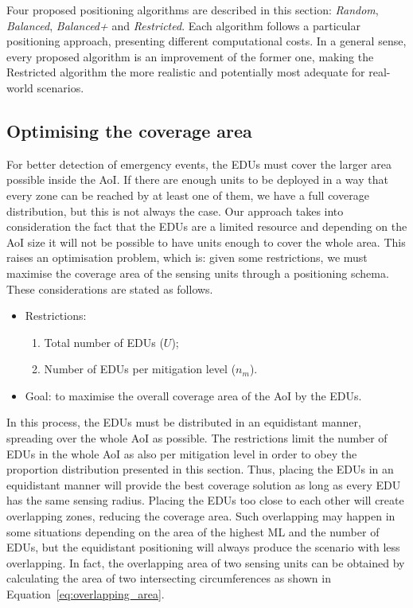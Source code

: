 \begin{refsection}
Four proposed positioning algorithms are described in this section: \emph{Random}, \emph{Balanced}, \emph{Balanced+} and \emph{Restricted}. Each algorithm follows a particular positioning approach, presenting different computational costs. In a general sense, every proposed algorithm is an improvement of the former one, making the Restricted algorithm the more realistic and potentially most adequate for real-world scenarios.

\subsection{Optimising the coverage area}

For better detection of emergency events, the EDUs must cover the larger area possible inside the AoI. If there are enough units to be deployed in a way that every zone can be reached by at least one of them, we have a full coverage distribution, but this is not always the case. Our approach takes into consideration the fact that the EDUs are a limited resource and depending on the AoI size it will not be possible to have units enough to cover the whole area. This raises an optimisation problem, which is: given some restrictions, we must maximise the coverage area of the sensing units through a positioning schema. These considerations are stated as follows.

\begin{itemize}
  \item Restrictions:
  \begin{enumerate}
    \item Total number of EDUs ($U$);
    \item Number of EDUs per mitigation level ($n_m$).
  \end{enumerate}
  \item Goal: to maximise the overall coverage area of the AoI by the EDUs.
\end{itemize}

In this process, the EDUs must be distributed in an equidistant manner, spreading over the whole AoI as possible. The restrictions limit the number of EDUs in the whole AoI as also per mitigation level in order to obey the proportion distribution presented in this section. Thus, placing the EDUs in an equidistant manner will provide the best coverage solution as long as every EDU has the same sensing radius. Placing the EDUs too close to each other will create overlapping zones, reducing the coverage area. Such overlapping may happen in some situations depending on the area of the highest ML and the number of EDUs, but the equidistant positioning will always produce the scenario with less overlapping. In fact, the overlapping area of two sensing units can be obtained by calculating the area of two intersecting circumferences as shown in Equation~\ref{eq:overlapping_area}.


\end{refsection}
